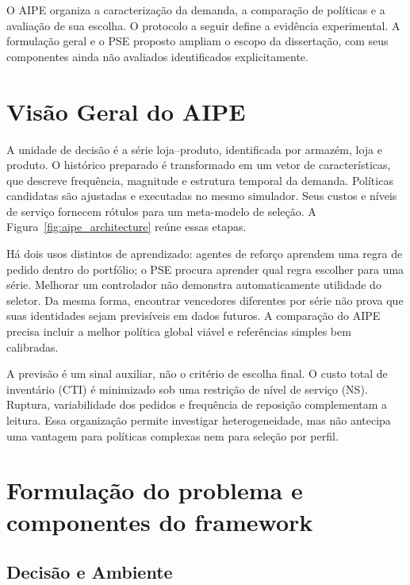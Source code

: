 
O AIPE organiza a caracterização da demanda, a comparação de políticas e a avaliação de sua escolha. O protocolo a seguir define a evidência experimental. A formulação geral e o PSE proposto ampliam o escopo da dissertação, com seus componentes ainda não avaliados identificados explicitamente.



\section{Visão Geral do AIPE}
\label{sec:visao_geral_aipe}

A unidade de decisão é a série loja--produto, identificada por armazém, loja e produto. O histórico preparado é transformado em um vetor de características, que descreve frequência, magnitude e estrutura temporal da demanda. Políticas candidatas são ajustadas e executadas no mesmo simulador. Seus custos e níveis de serviço fornecem rótulos para um meta-modelo de seleção. A Figura~\ref{fig:aipe_architecture} reúne essas etapas.



Há dois usos distintos de aprendizado: agentes de reforço aprendem uma regra de pedido dentro do portfólio; o PSE procura aprender qual regra escolher para uma série. Melhorar um controlador não demonstra automaticamente utilidade do seletor. Da mesma forma, encontrar vencedores diferentes por série não prova que suas identidades sejam previsíveis em dados futuros. A comparação do AIPE precisa incluir a melhor política global viável e referências simples bem calibradas.

A previsão é um sinal auxiliar, não o critério de escolha final. O custo total de inventário (CTI) é minimizado sob uma restrição de nível de serviço (NS). Ruptura, variabilidade dos pedidos e frequência de reposição complementam a leitura. Essa organização permite investigar heterogeneidade, mas não antecipa uma vantagem para políticas complexas nem para seleção por perfil.

\section{Formulação do problema e componentes do framework}
\label{sec:formulacao}
\subsection{Decisão e Ambiente}
\label{sec:instanciacao_ambiente}

